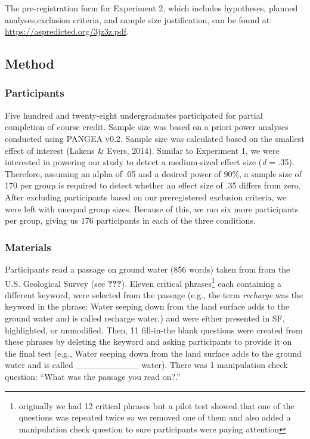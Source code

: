 \documentclass[english,pdf]{apa6}
\begin{document}
The pre-registration form for Experiment 2, which includes hypotheses, planned analyses,exclusion criteria, and sample size justification, can be found at: \url{https://aspredicted.org/3jz3z.pdf}.

\hypertarget{method-1}{%
\subsection{Method}\label{method-1}}

\hypertarget{participants-1}{%
\subsubsection{Participants}\label{participants-1}}

Five hundred and twenty-eight undergraduates participated for partial completion of course credit. Sample size was based on a priori power analyses conducted using PANGEA v0.2. Sample size was calculated based on the smallest effect of interest (Lakens \& Evers, 2014). Similar to Experiment 1, we were interested in powering our study to detect a medium-sized effect size (\emph{d} = .35). Therefore, assuming an alpha of .05 and a desired power of 90\%, a sample size of 170 per group is required to detect whether an effect size of .35 differs from zero. After excluding participants based on our preregistered exclusion criteria, we were left with unequal group sizes. Because of this, we ran six more participants per group, giving us 176 participants in each of the three conditions.

\hypertarget{materials-1}{%
\subsubsection{Materials}\label{materials-1}}

Participants read a passage on ground water (856 words) taken from from the U.S. Geological Survey (see {\textbf{???}}). Eleven critical phrases\footnote{originally we had 12 critical phrases but a pilot test showed that one of the questions was repeated twice so we removed one of them and also added a manipulation check question to sure participants were paying attention} each containing a different keyword, were selected from the passage (e.g., the term \emph{recharge} was the keyword in the phrase: Water seeping down from the land surface adds to the ground water and is called recharge water.) and were either presented in SF, highlighted, or unmodified. Then, 11 fill-in-the blank questions were created from these phrases by deleting the keyword and asking participants to provide it on the final test (e.g., Water seeping down from the land surface adds to the ground water and is called \_\_\_\_\_\_\_\_\_\_ water). There was 1 manipulation check question: \enquote{What was the passage you read on?.}
\end{document}
